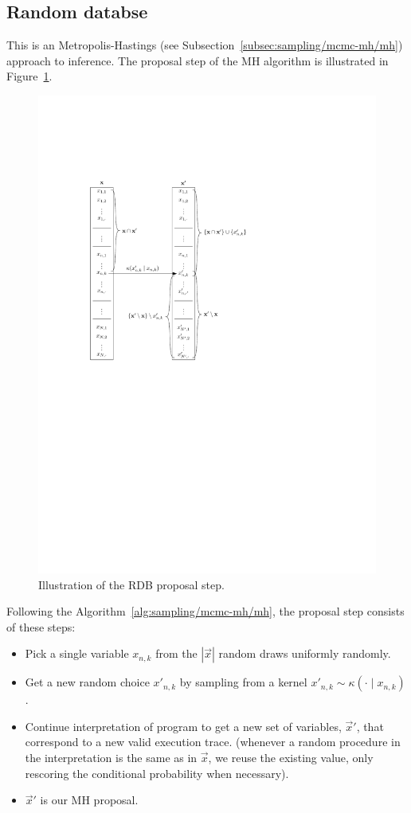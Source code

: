\subsection{Random databse}
This is an Metropolis-Hastings (see Subsection~\ref{subsec:sampling/mcmc-mh/mh}) approach to inference. The proposal step of the MH algorithm is illustrated in Figure~\ref{fig:pprog/how/figures/rdb}. 
\begin{figure}[!htb]
\centering
\includegraphics[scale=1]{pprog/how/figures/rdb/rdb}
\caption{Illustration of the RDB proposal step.}
\label{fig:pprog/how/figures/rdb}
\end{figure}
Following the Algorithm~\ref{alg:sampling/mcmc-mh/mh}, the proposal step consists of these steps:
\begin{itemize}
	\item Pick a single variable $x_{n, k}$ from the $|\vec x|$ random draws uniformly randomly.
	\item Get a new random choice $x'_{n, k}$ by sampling from a kernel $x'_{n, k} \sim \kappa(\cdot \mid x_{n, k})$. 
	\item Continue interpretation of program to get a new set of variables, $\vec x'$, that correspond to a new valid execution trace. (whenever a random procedure in the interpretation is the same as in $\vec x$, we reuse the existing value, only rescoring the conditional probability when necessary).
	\item $\vec x'$ is our MH proposal.
\end{itemize}
